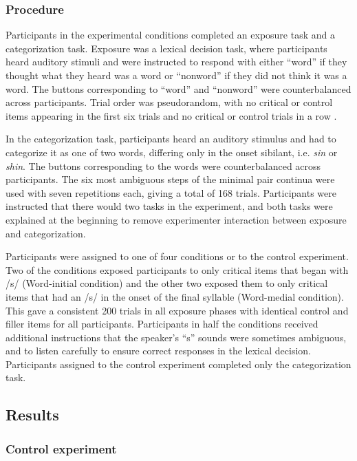 \subsubsection{Procedure}

Participants in the experimental conditions completed an exposure task and a categorization task.  
Exposure was a lexical decision task, where participants heard auditory stimuli and were instructed to respond with either ``word'' if they thought what they heard was a word or ``nonword'' if they did not think it was a word.  
The buttons corresponding to ``word'' and ``nonword'' were counterbalanced across participants. Trial order was pseudorandom, with no critical or control items appearing in the first six trials and no critical or control trials in a row \citep[following][]{Reinisch2013}.

In the categorization task, participants heard an auditory stimulus and had to categorize it as one of two words, differing only in the onset sibilant, i.e. \emph{sin} or \emph{shin}.  
The buttons corresponding to the words were counterbalanced across participants.  
The six most ambiguous steps of the minimal pair continua were used with seven repetitions each, giving a total of 168 trials.
Participants were instructed that there would two tasks in the experiment, and both tasks were explained at the beginning to remove experimenter interaction between exposure and categorization.  

Participants were assigned to one of four conditions or to the control experiment. 
Two of the conditions exposed participants to only critical items that began with /s/ (Word-initial condition) and the other two exposed them to only critical items that had an /s/ in the onset of the final syllable (Word-medial condition).
This gave a consistent 200 trials in all exposure phases with identical control and filler items for all participants. 
Participants in half the conditions received additional instructions that the speaker's ``s'' sounds were sometimes ambiguous, and to listen carefully to ensure correct responses in the lexical decision.
Participants assigned to the control experiment completed only the categorization task.

\subsection{Results}

\subsubsection{Control experiment}

